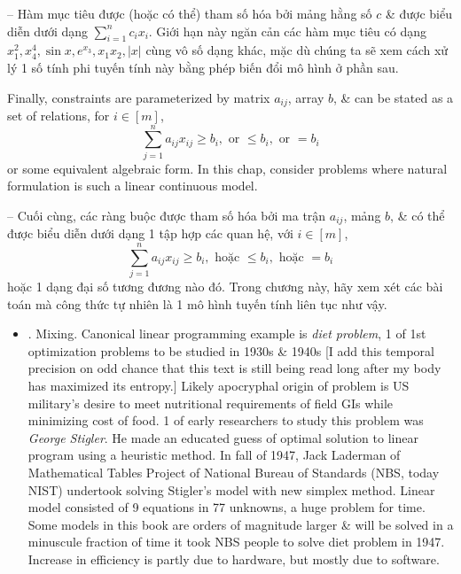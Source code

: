 \documentclass{article}
\begin{document}
\begin{itemize}
    -- Hàm mục tiêu được (hoặc có thể) tham số hóa bởi mảng hằng số $c$ \& được biểu diễn dưới dạng $\sum_{i=1}^n c_ix_i$. Giới hạn này ngăn cản các hàm mục tiêu có dạng $x_1^2,x_4^4,\sin x,e^{x_3},x_1x_2,|x|$ cùng vô số dạng khác, mặc dù chúng ta sẽ xem cách xử lý 1 số tính phi tuyến tính này bằng phép biến đổi mô hình ở phần sau.

    Finally, constraints are parameterized by matrix $a_{ij}$, array $b$, \& can be stated as a set of relations, for $i\in[m]$,
    \begin{equation*}
        \sum_{j=1}^n a_{ij}x_{ij}\ge b_i,\mbox{ or } \le b_i,\mbox{ or } = b_i
    \end{equation*}
    or some equivalent algebraic form. In this chap, consider problems where natural formulation is such a linear continuous model.

    -- Cuối cùng, các ràng buộc được tham số hóa bởi ma trận $a_{ij}$, mảng $b$, \& có thể được biểu diễn dưới dạng 1 tập hợp các quan hệ, với $i\in[m]$,
    \begin{equation*}
        \sum_{j=1}^n a_{ij}x_{ij}\ge b_i,\mbox{ hoặc } \le b_i,\mbox{ hoặc } = b_i
    \end{equation*}
    hoặc 1 dạng đại số tương đương nào đó. Trong chương này, hãy xem xét các bài toán mà công thức tự nhiên là 1 mô hình tuyến tính liên tục như vậy.
    \begin{itemize}
        \item {. Mixing.} Canonical linear programming example is {\it diet problem}, 1 of 1st optimization problems to be studied in 1930s \& 1940s [I add this temporal precision on odd chance that this text is still being read long after my body has maximized its entropy.] Likely apocryphal origin of problem is US military's desire to meet nutritional requirements of field GIs while minimizing cost of food. 1 of early researchers to study this problem was {\it George Stigler}. He made an educated guess of optimal solution to linear program using a heuristic method. In fall of 1947, {\sc Jack Laderman} of Mathematical Tables Project of National Bureau of Standards (NBS, today NIST) undertook solving Stigler's model with new simplex method. Linear model consisted of 9 equations in 77 unknowns, a huge problem for time. Some models in this book are orders of magnitude larger \& will be solved in a minuscule fraction of time it took NBS people to solve diet problem in 1947. Increase in efficiency is partly due to hardware, but mostly due to software.


\end{itemize}
\end{itemize}
\end{document}
